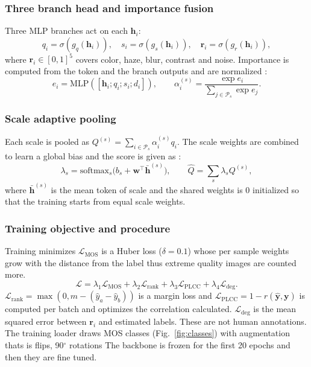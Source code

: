 \documentclass[conference]{IEEEtran}
\begin{document}
\subsubsection{Three branch head and importance fusion}
Three MLP branches act on each $\mathbf{h}_i$:
\begin{equation}
q_i=\sigma(g_q(\mathbf{h}_i)),\quad s_i=\sigma(g_s(\mathbf{h}_i)),\quad \mathbf{r}_i=\sigma(g_r(\mathbf{h}_i)),
\end{equation}
where $\mathbf{r}_i\in[0,1]^5$ covers color, haze, blur, contrast and noise. Importance is computed from the token and the branch outputs and are normalized :
\begin{equation}
e_i=\mathrm{MLP}([\mathbf{h}_i;q_i;s_i;d_i]),\qquad
\alpha_i^{(s)}=\frac{\exp e_i}{\sum_{j\in\mathcal{P}_s}\exp e_j}.
\end{equation}
\vspace{0.2cm}
\subsubsection{Scale adaptive pooling}
Each scale is pooled as $Q^{(s)}=\sum_{i\in\mathcal{P}_s}\alpha_i^{(s)}q_i$. The scale weights are combined to learn a global bias and the score is given as :
\begin{equation}
\lambda_s=\mathrm{softmax}_s\!\big(b_s+\mathbf{w}^{\top}\bar{\mathbf{h}}^{(s)}\big),\qquad
\hat{Q}=\sum_{s}\lambda_s Q^{(s)},
\end{equation}
where $\bar{\mathbf{h}}^{(s)}$ is the mean token of scale and the shared  weights is 0 initialized  so that the training starts from equal scale weights.
\vspace{0.2cm}
\subsubsection{Training objective and procedure}
Training minimizes
$\mathcal{L}_{\text{MOS}}$ is a Huber loss ($\delta=0.1$) whose per sample weights grow with the distance from the label  thus extreme quality images are counted more. 
\begin{equation}
\mathcal{L}=\lambda_{1}\mathcal{L}_{\text{MOS}}+\lambda_{2}\mathcal{L}_{\text{rank}}+\lambda_{3}\mathcal{L}_{\text{PLCC}}+\lambda_{4}\mathcal{L}_{\text{deg}}.
\end{equation}$\mathcal{L}_{\text{rank}}=\max(0,m-(\hat{y}_a-\hat{y}_b))$ is a margin loss and $\mathcal{L}_{\text{PLCC}}=1-r(\hat{\mathbf{y}},\mathbf{y})$ is computed per batch and optimizes the correlation calculated. $\mathcal{L}_{\text{deg}}$ is the mean squared error between $\mathbf{r}_i$ and estimated labels. These are not human annotations. The training loader draws MOS classes (Fig.~\ref{fig:classes}) with augmentation thats is flips, 90$^\circ$ rotations The backbone is frozen for the first 20 epochs and then they are fine tuned.
\vspace{0.2cm}
\end{document}
